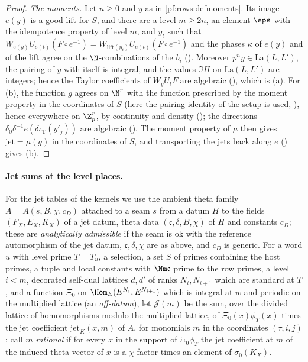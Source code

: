 \begin{proof}
\emph{The moments.} Let $n\ge0$ and $y$ as in \cref{pf:rows:defmoments}. Its image $e(y)$ is a good lift for $S$, and there are a
level $m\ge2n$, an element $\eps$ with the idempotence property of level $m$, and $y_t$ such that
$W_{e(y)}U_{e(t)}(F\circ e^{-1})=W_{\mathrm{lift}(y_t)}U_{e(t)}(F\circ e^{-1})$
and the phases $\kappa$ of $e(y)$ and of the lift agree on the $\N$-combinations of the $b_i$
(). Moreover $p^ny\in\mathrm{La}(L,L')$, the pairing of $y$ with itself is
integral, and the values $\Im H$ on $\mathrm{La}(L,L')$ are integers; hence the Taylor coefficients of $W_yU_tF$ are algebraic
(), which is (a). For (b), the function $g$ agrees on $\N^r$
with the function prescribed by the moment property in the coordinates of $S$ (here the pairing identity of the setup is used,
), hence everywhere on $\Z_p^r$, by continuity and density
(); the directions $\delta_0\delta^{-1}e(\delta\iota_{\mathrm T}(y'_j))$
are algebraic (). The moment property of $\mu$ then gives
$\mathrm{jet}=\mu(g)$ in the coordinates of $S$, and transporting the jets back along $e$
() gives (b).
\end{proof}

\paragraph{Jet sums at the level places.}
For the jet tables of the kernels we use the ambient theta family $A=A(s,B,\chi,c_D)$ attached to a seam $s$ from a datum $H$ to the
fields $(F_X,E_X,K_X)$ of a jet datum, theta data $(\mathfrak c,\delta,B,\chi)$ of $H$ and constants $c_D$; these are \emph{analytically
admissible} if the seam is ok with the reference automorphism of the jet datum, $\mathfrak c,\delta,\chi$ are as above, and $c_D$ is
generic. For a word $u$ with level prime $T=T_u$, a selection, a set $S$ of primes containing the host primes, a tuple and local
constants with $\Nm\mathfrak c$ prime to the row primes, a level $i<m$, decorated self-dual lattices $d,d'$ of ranks $N_i,N_{i+1}$
which are standard at $T$, and a function $\Xi_0$ on $\Hom_E(E^{N_i},E^{N_{i+1}})$ which is integral at $w$ and periodic on the
multiplied lattice (an \emph{off-datum}), let $\mathcal J(m)$ be the sum, over the divided lattice of homomorphisms modulo the
multiplied lattice, of $\Xi_0(x)\phi_T(x)$ times the jet coefficient $\mathrm{jet}_K(x,m)$ of $A$, for monomials $m$ in the coordinates
$(\tau,i,j)$; call $m$ \emph{rational} if for every $x$ in the support of $\Xi_0\phi_T$ the jet coefficient at $m$ of the induced theta
vector of $x$ is a $\chi$-factor times an element of $\sigma_0(K_X)$.

